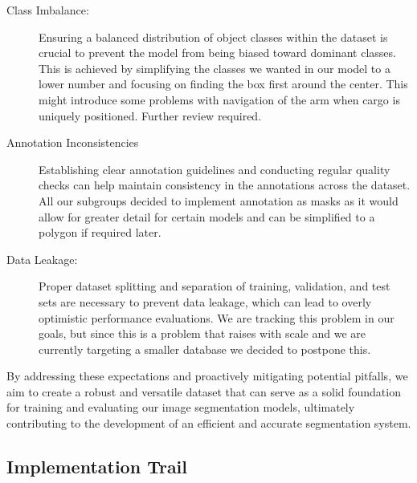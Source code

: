 \begin{description}
    \item[Class Imbalance:] Ensuring a balanced distribution of object classes within the dataset is crucial to prevent the model from being biased toward dominant classes. This is achieved by simplifying the classes we wanted in our model to a lower number and focusing on finding the box first around the center. This might introduce some problems with navigation of the arm when cargo is uniquely positioned. Further review required.
    \item[Annotation Inconsistencies] Establishing clear annotation guidelines and conducting regular quality checks can help maintain consistency in the annotations across the dataset. All our subgroups decided to implement annotation as masks as it would allow for greater detail for certain models and can be simplified to a polygon if required later.
    \item[Data Leakage:] Proper dataset splitting and separation of training, validation, and test sets are necessary to prevent data leakage, which can lead to overly optimistic performance evaluations. We are tracking this problem in our goals, but since this is a problem that raises with scale and we are currently targeting a smaller database we decided to postpone this.
\end{description}

By addressing these expectations and proactively mitigating potential pitfalls, we aim to create a robust and versatile dataset that can serve as a solid foundation for training and evaluating our image segmentation models, ultimately contributing to the development of an efficient and accurate segmentation system.

\subsection{Implementation Trail}

